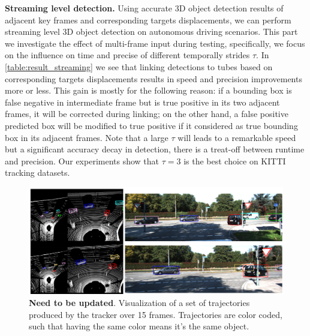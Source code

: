 \documentclass{bmvc2k}
\begin{document}
\textbf{Streaming level detection.} Using accurate 3D object detection results of adjacent key frames and corresponding targets displacements, we can perform streaming level 3D object detection on autonomous driving scenarios. This part we investigate the effect of multi-frame input during testing, specifically, we focus on the influence on time and precise of different temporally strides $\tau$. In \tablename \, \ref{table:result_streaming} we see that linking detections to tubes based on corresponding targets displacements results in speed and precision improvements more or less. This gain is mostly for the following reason: if a bounding box is false negative in intermediate frame but is true positive in its two adjacent frames, it will be corrected during linking; on the other hand, a false positive predicted box will be modified to true positive if it considered as true bounding box in its adjacent frames. Note that a large $\tau$ will leads to a remarkable speed but a significant accuracy decay in detection, there is a treat-off between runtime and precision. Our experiments show that $\tau = 3$ is the best choice on KITTI tracking datasets.

\begin{figure}
	\rule{0pt}{1ex}
	\setlength{\abovecaptionskip}{-0.5cm}
	\begin{center}
		\includegraphics[width=\textwidth]{images/examples.png}
	\end{center}
	\caption{\textbf{Need to be updated}. Visualization of a set of trajectories produced by the tracker over 15 frames. Trajectories are color coded, such that
				having the same color means it's the same object.}
	\label{fig:examples}
	\vspace{-0.5cm}
\end{figure}
\end{document}
